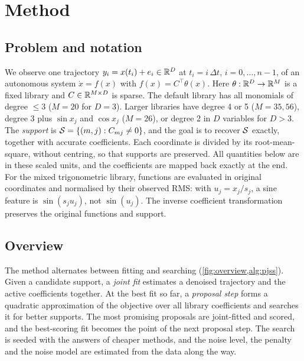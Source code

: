 \section{Method}
\label{sec:method}

\subsection{Problem and notation}
We observe one trajectory $y_i = x(t_i) + e_i \in \mathbb{R}^D$ at $t_i = i\,\Delta t$, $i=0,\dots,n-1$, of an autonomous system $\dot x = f(x)$ with $f(x)=C^\top\theta(x)$. Here $\theta:\mathbb{R}^D\to\mathbb{R}^M$ is a fixed library and $C\in\mathbb{R}^{M\times D}$ is sparse. The default library has all monomials of degree $\le 3$ ($M=20$ for $D=3$). Larger libraries have degree 4 or 5 ($M=35, 56$), degree 3 plus $\sin x_j$ and $\cos x_j$ ($M=26$), or degree 2 in $D$ variables for $D>3$. The \emph{support} is $\mathcal{S}=\{(m,j): C_{mj}\ne 0\}$, and the goal is to recover $\mathcal{S}$ exactly, together with accurate coefficients. Each coordinate is divided by its root-mean-square, without centring, so that supports are preserved. All quantities below are in these scaled units, and the coefficients are mapped back exactly at the end. For the mixed trigonometric library, functions are evaluated in original coordinates and normalised by their observed RMS: with $u_j=x_j/s_j$, a sine feature is $\sin(s_j u_j)$, not $\sin(u_j)$. The inverse coefficient transformation preserves the original functions and support.

\subsection{Overview}
\label{sec:overview}
The method alternates between fitting and searching (\cref{fig:overview,alg:pjss}). Given a candidate support, a \emph{joint fit} estimates a denoised trajectory and the active coefficients together. At the best fit so far, a \emph{proposal step} forms a quadratic approximation of the objective over all library coefficients and searches it for better supports. The most promising proposals are joint-fitted and scored, and the best-scoring fit becomes the point of the next proposal step. The search is seeded with the answers of cheaper methods, and the noise level, the penalty and the noise model are estimated from the data along the way.

